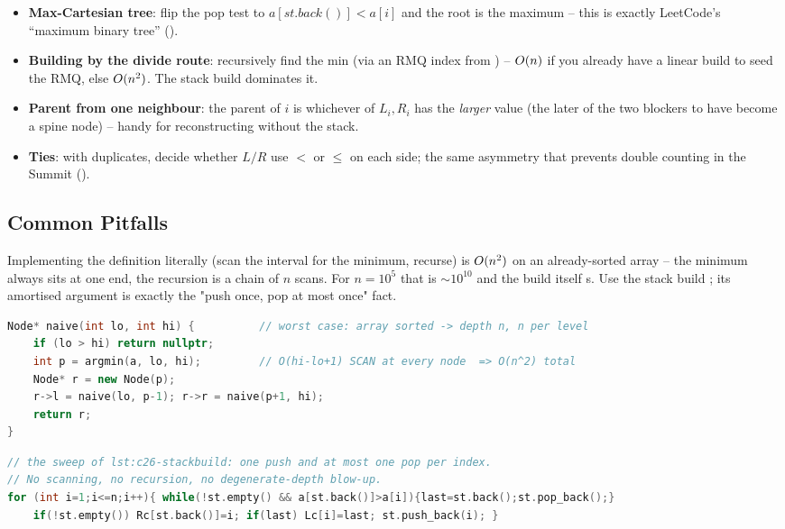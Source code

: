 \begin{itemize}[nosep]
  \item \textbf{Max-Cartesian tree}: flip the pop test to $a[\mathit{st.back()}] < a[i]$ and the root
        is the maximum -- this is exactly LeetCode's ``maximum binary tree'' (). \hfill{}
  \item \textbf{Building by the divide route}: recursively find the min (via an RMQ index from
        ) -- $O(n)$ if you already have a linear build to seed the RMQ, else
        $O(n^2)$. The stack build dominates it. \hfill{}
  \item \textbf{Parent from one neighbour}: the parent of $i$ is whichever of $L_i, R_i$ has the
        \emph{larger} value (the later of the two blockers to have become a spine node) -- handy for
        reconstructing without the stack. \hfill{}
  \item \textbf{Ties}: with duplicates, decide whether $L/R$ use $<$ or $\le$ on each side; the same
        asymmetry that prevents double counting in the Summit (). \hfill{}
\end{itemize}

\subsection{Common Pitfalls}\label{sec:c26-cartesian-pitfalls}

\begin{warningbox}
Implementing the definition literally (scan the interval for the minimum, recurse) is $O(n^2)$ on
an already-sorted array -- the minimum always sits at one end, the recursion is a chain of $n$ scans.
For $n=10^5$ that is $\sim 10^{10}$ and the build itself \tle s. Use the stack build
; its amortised argument is exactly the "push once, pop at most once" fact.
\end{warningbox}
\begin{lstlisting}[caption={\textcolor{warningred}{WRONG}: the naive divide-by-minimum build is $O(n^2)$ on sorted input}, language=C++, basicstyle=\ttfamily\small]
Node* naive(int lo, int hi) {          // worst case: array sorted -> depth n, n per level
    if (lo > hi) return nullptr;
    int p = argmin(a, lo, hi);         // O(hi-lo+1) SCAN at every node  => O(n^2) total
    Node* r = new Node(p);
    r->l = naive(lo, p-1); r->r = naive(p+1, hi);
    return r;
}
\end{lstlisting}
\begin{lstlisting}[caption={\textcolor{successgreen}{RIGHT}: the monotonic stack builds it once, in $O(n)$}, language=C++, basicstyle=\ttfamily\small]
// the sweep of lst:c26-stackbuild: one push and at most one pop per index.
// No scanning, no recursion, no degenerate-depth blow-up.
for (int i=1;i<=n;i++){ while(!st.empty() && a[st.back()]>a[i]){last=st.back();st.pop_back();}
    if(!st.empty()) Rc[st.back()]=i; if(last) Lc[i]=last; st.push_back(i); }
\end{lstlisting}

